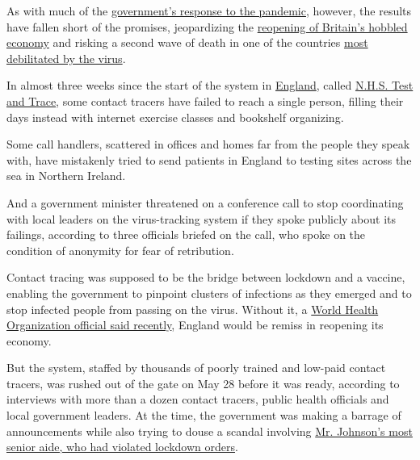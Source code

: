 As with much of the
\href{https://www.nytimes.com/2020/05/25/world/europe/coronavirus-uk-nursing-homes.html}{government's
response to the pandemic}, however, the results have fallen short of the
promises, jeopardizing the
\href{https://www.nytimes.com/2020/05/11/world/europe/coronavirus-uk-boris-johnson.html}{reopening
of Britain's hobbled economy} and risking a second wave of death in one
of the countries
\href{https://www.nytimes.com/interactive/2020/world/coronavirus-maps.html}{most
debilitated by the virus}.

In almost three weeks since the start of the system in
\href{https://www.nytimes.com/2020/07/03/world/europe/britain-quarantine-us-coronavirus.html}{England},
called
\href{https://www.nhs.uk/conditions/coronavirus-covid-19/testing-and-tracing/nhs-test-and-trace-if-youve-been-in-contact-with-a-person-who-has-coronavirus/}{N.H.S.
Test and Trace}, some contact tracers have failed to reach a single
person, filling their days instead with internet exercise classes and
bookshelf organizing.

Some call handlers, scattered in offices and homes far from the people
they speak with, have mistakenly tried to send patients in England to
testing sites across the sea in Northern Ireland.

And a government minister threatened on a conference call to stop
coordinating with local leaders on the virus-tracking system if they
spoke publicly about its failings, according to three officials briefed
on the call, who spoke on the condition of anonymity for fear of
retribution.

Contact tracing was supposed to be the bridge between lockdown and a
vaccine, enabling the government to pinpoint clusters of infections as
they emerged and to stop infected people from passing on the virus.
Without it, a
\href{https://www.theguardian.com/world/2020/jun/14/who-cautions-against-further-lifting-lockdown-england}{World
Health Organization official said recently}, England would be remiss in
reopening its economy.

But the system, staffed by thousands of poorly trained and low-paid
contact tracers, was rushed out of the gate on May 28 before it was
ready, according to interviews with more than a dozen contact tracers,
public health officials and local government leaders. At the time, the
government was making a barrage of announcements while also trying to
douse a scandal involving
\href{https://www.nytimes.com/2020/05/23/world/europe/dominic-cummings-lockdown.html}{Mr.
Johnson's most senior aide, who had violated lockdown orders}.

